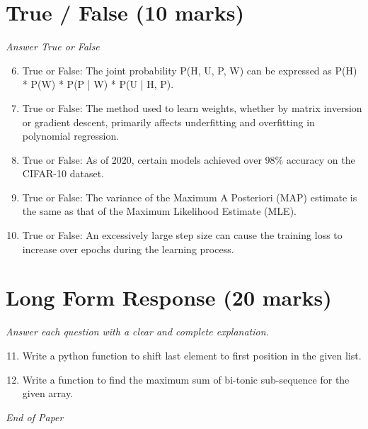 \documentclass[12pt]{article}
\begin{document}
\section*{True / False (10 marks)}
\textit{Answer True or False}
\begin{enumerate}[label=\arabic*.]
\setcounter{enumi}{5}
\item True or False: The joint probability P(H, U, P, W) can be expressed as P(H) * P(W) * P(P | W) * P(U | H, P).
\item True or False: The method used to learn weights, whether by matrix inversion or gradient descent, primarily affects underfitting and overfitting in polynomial regression.
\item True or False: As of 2020, certain models achieved over 98\% accuracy on the CIFAR-10 dataset.
\item True or False: The variance of the Maximum A Posteriori (MAP) estimate is the same as that of the Maximum Likelihood Estimate (MLE).
\item True or False: An excessively large step size can cause the training loss to increase over epochs during the learning process.
\end{enumerate}

\section*{Long Form Response (20 marks)}
\textit{Answer each question with a clear and complete explanation.}
\begin{enumerate}[label=\arabic*.]
\setcounter{enumi}{10}
\item Write a python function to shift last element to first position in the given list.
\item Write a function to find the maximum sum of bi-tonic sub-sequence for the given array.
\end{enumerate}

\vfill
\noindent\textit{End of Paper}
\end{document}
